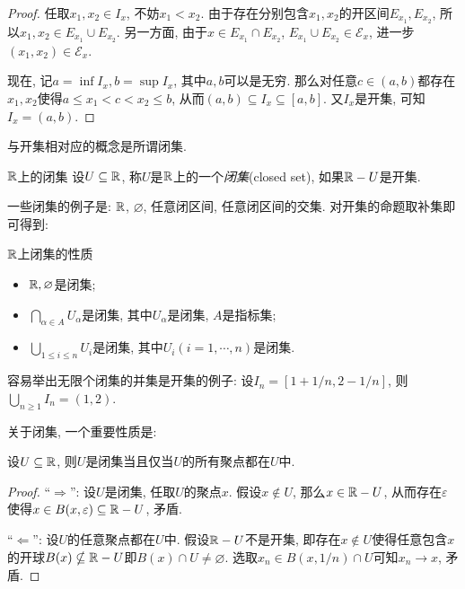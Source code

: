 \begin{proof}
	任取$x_1,x_2 \in I_x$, 不妨$x_1<x_2$. 由于存在分别包含$x_1,x_2$的开区间$E_{x_1}, E_{x_2}$, 所以$x_1,x_2 \in E_{x_1} \cup E_{x_2}$. 另一方面, 由于$x \in E_{x_1} \cap E_{x_2}$, $E_{x_1} \cup E_{x_2} \in \mathcal{E}_x$, 进一步$(x_1,x_2) \in \mathcal{E}_x$. 
	
	现在, 记$a = \inf I_x,b = \sup I_x$, 其中$a,b$可以是无穷. 那么对任意$c \in (a,b)$都存在$x_1,x_2$使得$a \leq x_1 < c < x_2 \leq b$, 从而$(a,b) \subseteq I_x \subseteq [a,b]$. 又$I_x$是开集, 可知$I_x = (a,b)$. 
\end{proof}

与开集相对应的概念是所谓闭集. 

\begin{definition}{$\mathbb{R}$上的闭集}
	设$U \subseteq \mathbb{R}$, 称$U$是$\mathbb{R}$上的一个\textit{闭集}(closed set), 如果$\mathbb{R} - U$是开集. 
\end{definition}

一些闭集的例子是: $\mathbb{R}$, $\varnothing$, 任意闭区间, 任意闭区间的交集. 对开集的命题取补集即可得到: 

\begin{proposition}{$\mathbb{R}$上闭集的性质}
	\vspace{-2em}
	\begin{itemize}
		\item $\mathbb{R},\varnothing$是闭集; 
		\item $\bigcap_{\alpha \in A} U_{\alpha}$是闭集, 其中$U_{\alpha}$是闭集, $A$是指标集; 
		\item $\bigcup_{1 \leq i \leq n} U_i$是闭集, 其中$U_i(i=1,\cdots ,n)$是闭集. 
	\end{itemize}
\end{proposition}
\begin{remark}
	容易举出无限个闭集的并集是开集的例子: 设$I_n = [1+1/n,2-1/n]$, 则$\bigcup_{n\geq 1} I_n = (1,2)$. 
\end{remark}

关于闭集, 一个重要性质是: 

\begin{proposition}{}
	设$U \subseteq \mathbb{R}$, 则$U$是闭集当且仅当$U$的所有聚点都在$U$中. 
\end{proposition}
\begin{proof}
	“$\Rightarrow$”: 设$U$是闭集, 任取$U$的聚点$x$. 假设$x \notin U$, 那么$x \in \mathbb{R} - U$, 从而存在$\varepsilon$使得$x \in B(x,\varepsilon) \subseteq \mathbb{R} - U$, 矛盾. 
	
	“$\Leftarrow$”: 设$U$的任意聚点都在$U$中. 假设$\mathbb{R} - U$不是开集, 即存在$x \notin U$使得任意包含$x$的开球$B(x) \nsubseteq \mathbb{R} - U$即$B(x) \cap U \neq \varnothing$. 选取$x_n \in B(x,1/n) \cap U$可知$x_n \to x$, 矛盾. 
\end{proof}

